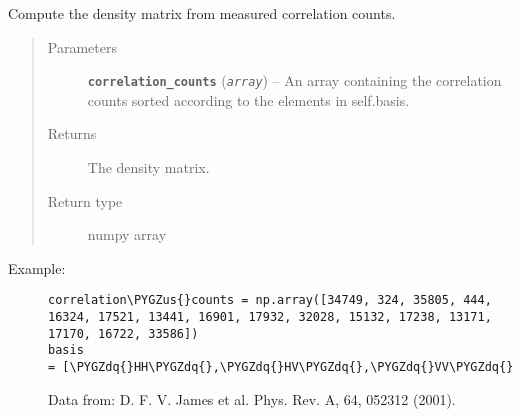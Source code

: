 \documentclass[letterpaper,10pt,english]{sphinxmanual}
\def\PYGZus{\char`\_}
\def\PYGZdq{\char`\"}
\begin{document}
\begin{fulllineitems}
\begin{fulllineitems}
\begin{quote}
\begin{description}
\end{description}\end{quote}

\end{fulllineitems}


\begin{fulllineitems}
\label{modules:Tomography.DensityMatrix.rho}
Compute the density matrix from measured correlation counts.
\begin{quote}\begin{description}
\item[{Parameters}] \leavevmode
\textbf{\texttt{correlation\_counts}} (\emph{\texttt{array}}) -- An array containing the correlation counts sorted according to the elements in self.basis.

\item[{Returns}] \leavevmode
The density matrix.

\item[{Return type}] \leavevmode
numpy array

\end{description}\end{quote}
\begin{description}
\item[{Example:}] \leavevmode
\begin{Verbatim}[commandchars=\\\{\}]
correlation\PYGZus{}counts = np.array([34749, 324, 35805, 444, 16324, 17521, 13441, 16901, 17932, 32028, 15132, 17238, 13171, 17170, 16722, 33586])
basis = [\PYGZdq{}HH\PYGZdq{},\PYGZdq{}HV\PYGZdq{},\PYGZdq{}VV\PYGZdq{},\PYGZdq{}VH\PYGZdq{},\PYGZdq{}RH\PYGZdq{},\PYGZdq{}RV\PYGZdq{},\PYGZdq{}DV\PYGZdq{},\PYGZdq{}DH\PYGZdq{},\PYGZdq{}DR\PYGZdq{},\PYGZdq{}DD\PYGZdq{},\PYGZdq{}RD\PYGZdq{},\PYGZdq{}HD\PYGZdq{},\PYGZdq{}VD\PYGZdq{},\PYGZdq{}VL\PYGZdq{},\PYGZdq{}HL\PYGZdq{},\PYGZdq{}RL\PYGZdq{}]
\end{Verbatim}

Data from: D. F. V. James et al. Phys. Rev. A, 64, 052312 (2001).

\end{description}

\end{fulllineitems}



\end{fulllineitems}
\end{document}

